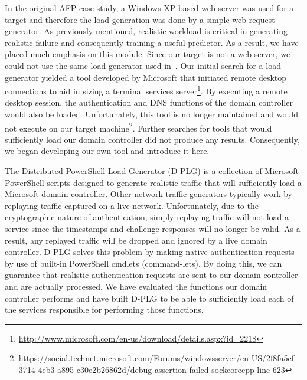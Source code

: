 In the original AFP case study, a Windows XP based web-server was used for a
target and therefore the load generation was done by a simple web request
generator.  As previously mentioned, realistic workload is critical in
generating realistic failure and consequently training a useful predictor.  As
a result, we have placed much emphasis on this module.  Since our target is not
a web server, we could not use the same load generator used
in~\cite{irrera2015}.  Our initial search for a load generator yielded a tool
developed by Microsoft that initiated remote desktop connections to aid in
sizing a terminal services
server\footnote{\url{http://www.microsoft.com/en-us/download/details.aspx?id=2218}}.
By executing a remote desktop session, the authentication and DNS functions of
the domain controller would also be loaded.  Unfortunately, this tool is no
longer maintained and would not execute on our target
machine\footnote{\url{https://social.technet.microsoft.com/Forums/windowsserver/en-US/2f8fa5cf-3714-4eb3-a895-c30e2b26862d/debug-assertion-failed-sockcorecpp-line-623}}.
Further searches for tools that would sufficiently load our domain controller
did not produce any results.  Consequently, we began developing our own tool
and introduce it here. 

The Distributed PowerShell Load Generator (D-PLG) is a collection of Microsoft
PowerShell scripts designed to generate realistic traffic that will
sufficiently load a Microsoft domain controller.  Other network traffic
generators typically work by replaying traffic captured on a live network.
Unfortunately, due to the cryptographic nature of authentication, simply
replaying traffic will not load a service since the timestamps and challenge
responses will no longer be valid.  As a result, any replayed traffic will be
dropped and ignored by a live domain controller.  D-PLG solves this problem by
making native authentication requests by use of built-in PowerShell cmdlets
(command-lets).  By doing this, we can guarantee that realistic authentication
requests are sent to our domain controller and are actually processed.  We have
evaluated the functions our domain controller performs and have built D-PLG to
be able to sufficiently load each of the services responsible for performing
those functions.

